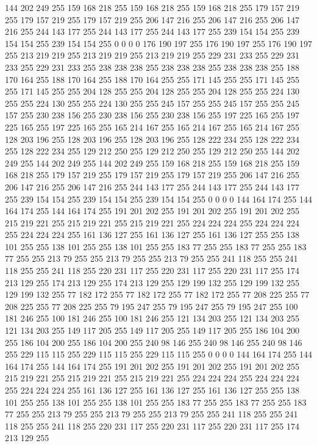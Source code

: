 144 202 249 255 159 168 218 255 159 168 218 255 159 168 218 255 179 157 219 255 179 157 219 255 179 157 219 255 206 147 216 255 206 147 216 255 206 147 216 255 244 143 177 255 244 143 177 255 244 143 177 255 239 154 154 255 239 154 154 255 239 154 154 255
0 0 0 0 176 190 197 255 176 190 197 255 176 190 197 255 213 219 219 255 213 219 219 255 213 219 219 255 229 231 233 255 229 231 233 255 229 231 233 255 238 238 238 255 238 238 238 255 238 238 238 255 188 170 164 255 188 170 164 255 188 170 164 255
255 171 145 255 255 171 145 255 255 171 145 255 255 204 128 255 255 204 128 255 255 204 128 255 255 224 130 255 255 224 130 255 255 224 130 255 255 245 157 255 255 245 157 255 255 245 157 255 230 238 156 255 230 238 156 255 230 238 156 255 197 225 165 255
197 225 165 255 197 225 165 255 165 214 167 255 165 214 167 255 165 214 167 255 128 203 196 255 128 203 196 255 128 203 196 255 128 222 234 255 128 222 234 255 128 222 234 255 129 212 250 255 129 212 250 255 129 212 250 255 144 202 249 255 144 202 249 255
144 202 249 255 159 168 218 255 159 168 218 255 159 168 218 255 179 157 219 255 179 157 219 255 179 157 219 255 206 147 216 255 206 147 216 255 206 147 216 255 244 143 177 255 244 143 177 255 244 143 177 255 239 154 154 255 239 154 154 255 239 154 154 255
0 0 0 0 144 164 174 255 144 164 174 255 144 164 174 255 191 201 202 255 191 201 202 255 191 201 202 255 215 219 221 255 215 219 221 255 215 219 221 255 224 224 224 255 224 224 224 255 224 224 224 255 161 136 127 255 161 136 127 255 161 136 127 255
255 138 101 255 255 138 101 255 255 138 101 255 255 183 77 255 255 183 77 255 255 183 77 255 255 213 79 255 255 213 79 255 255 213 79 255 255 241 118 255 255 241 118 255 255 241 118 255 220 231 117 255 220 231 117 255 220 231 117 255 174 213 129 255
174 213 129 255 174 213 129 255 129 199 132 255 129 199 132 255 129 199 132 255 77 182 172 255 77 182 172 255 77 182 172 255 77 208 225 255 77 208 225 255 77 208 225 255 79 195 247 255 79 195 247 255 79 195 247 255 100 181 246 255 100 181 246 255
100 181 246 255 121 134 203 255 121 134 203 255 121 134 203 255 149 117 205 255 149 117 205 255 149 117 205 255 186 104 200 255 186 104 200 255 186 104 200 255 240 98 146 255 240 98 146 255 240 98 146 255 229 115 115 255 229 115 115 255 229 115 115 255
0 0 0 0 144 164 174 255 144 164 174 255 144 164 174 255 191 201 202 255 191 201 202 255 191 201 202 255 215 219 221 255 215 219 221 255 215 219 221 255 224 224 224 255 224 224 224 255 224 224 224 255 161 136 127 255 161 136 127 255 161 136 127 255
255 138 101 255 255 138 101 255 255 138 101 255 255 183 77 255 255 183 77 255 255 183 77 255 255 213 79 255 255 213 79 255 255 213 79 255 255 241 118 255 255 241 118 255 255 241 118 255 220 231 117 255 220 231 117 255 220 231 117 255 174 213 129 255
